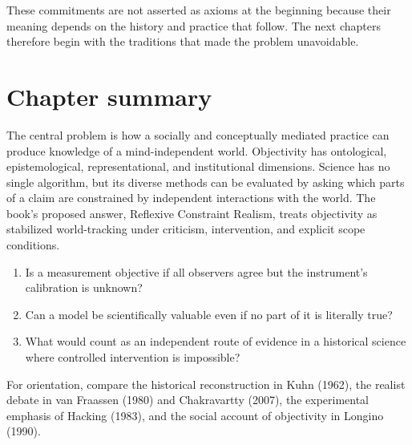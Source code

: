 These commitments are not asserted as axioms at the beginning because their
meaning depends on the history and practice that follow. The next chapters
therefore begin with the traditions that made the problem unavoidable.

\section*{Chapter summary}

The central problem is how a socially and conceptually mediated practice can
produce knowledge of a mind-independent world. Objectivity has ontological,
epistemological, representational, and institutional dimensions. Science has no
single algorithm, but its diverse methods can be evaluated by asking which
parts of a claim are constrained by independent interactions with the world.
The book's proposed answer, Reflexive Constraint Realism, treats objectivity as
stabilized world-tracking under criticism, intervention, and explicit scope
conditions.

\begin{discussion}
\begin{enumerate}
\item Is a measurement objective if all observers agree but the instrument's
calibration is unknown?
\item Can a model be scientifically valuable even if no part of it is literally
true?
\item What would count as an independent route of evidence in a historical
science where controlled intervention is impossible?
\end{enumerate}
\end{discussion}

\begin{furtherreading}
For orientation, compare the historical reconstruction in Kuhn (1962), the
realist debate in van Fraassen (1980) and Chakravartty (2007), the experimental
emphasis of Hacking (1983), and the social account of objectivity in Longino
(1990).
\end{furtherreading}
